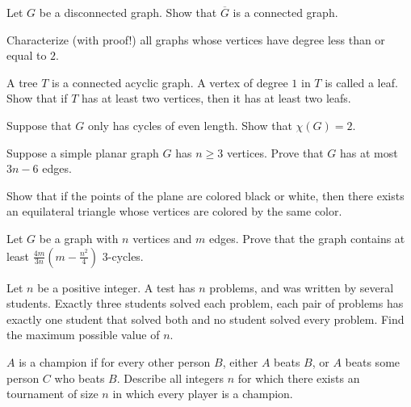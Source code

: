 \documentclass[12pt]{article}
\begin{document}
        \begin{exercise}
        Let $G$ be a disconnected graph. Show that $\overline{G}$ is a connected graph.
        \end{exercise}
        
        \begin{exercise}
        Characterize (with proof!) all graphs whose vertices have degree less than or equal to $2$.
        \end{exercise}
        
        \begin{exercise}
        A tree $T$ is a connected acyclic graph. A vertex of degree $1$ in $T$ is called a leaf. Show that if $T$ has at least two vertices, then it has at least two leafs.  
        \end{exercise}
        
        \begin{exercise}
        Suppose that $G$ only has cycles of even length. Show that $\chi(G) = 2$.
        \end{exercise}
        
        \begin{exercise}
        Suppose a simple planar graph $G$ has $n \geq 3$ vertices. Prove that $G$ has at most $3n - 6$ edges. 
        \end{exercise}
        
        \begin{exercise}
        Show that if the points of the plane are colored black or white, then there exists an equilateral triangle whose vertices are colored by the same color.
        \end{exercise}
        
        \begin{exercise}
        Let $G$ be a graph with $n$ vertices and $m$ edges. Prove that the graph contains at least $\frac{4m}{3n}(m - \frac{n^{2}}{4})$ $3$-cycles.
        \end{exercise}
        
        \begin{exercise}
        Let $n$ be a positive integer. A test has $n$ problems, and was written by several students. Exactly three students solved each problem, each pair of problems has exactly one student that solved both and no student solved every problem. Find the maximum possible value of $n$.
        \end{exercise}
        
        \begin{exercise}
        $A$ is a champion if for every other person $B$, either $A$ beats $B$, or $A$ beats some person $C$ who beats $B$. Describe all integers $n$ for which there exists an tournament of size $n$ in which every player is a champion.
        \end{exercise}
        
\end{document}
